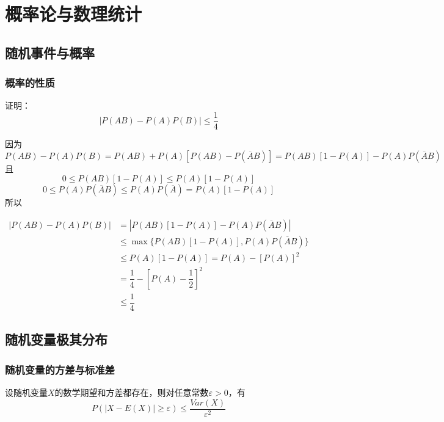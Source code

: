 \chapter{概率论与数理统计}

\section{随机事件与概率}

\subsection{概率的性质}

\begin{proposition}

    证明：
    \[|P(AB) - P(A)P(B)| \leq \dfrac{1}{4}\]

\end{proposition}

\begin{proposition}

    因为
    \[P(AB) - P(A)P(B) = P(AB) + P(A)[P(AB) - P(\overline{A}B)] = P(AB)[1 - P(A)] - P(A)P(\overline{A}B)\]
    且
    \[0 \leq P(AB)[1 - P(A)] \leq P(A)[1 - P(A)]\]
    \[0 \leq P(A)P(\overline{A}B) \leq P(A)P(\overline{A}) = P(A)[1 - P(A)]\]
    所以
    
    \begin{align*}
        |P(AB) - P(A)P(B)| & = |P(AB)[1 - P(A)] - P(A)P(\overline{A}B)| \\
        & \leq \max\{P(AB)[1 - P(A)], P(A)P(\overline{A}B)\} \\
        & \leq P(A)[1 - P(A)] = P(A) - [P(A)]^2 \\
        & = \dfrac{1}{4} - \left[ P(A) - \dfrac{1}{2} \right]^2 \\
        & \leq \dfrac{1}{4}
    \end{align*}

\end{proposition}

\section{随机变量极其分布}

\subsection{随机变量的方差与标准差}

\begin{theorem}[Chebyshev不等式]
    
    设随机变量$X$的数学期望和方差都存在，则对任意常数$\varepsilon > 0$，有
    \[P(|X - E(X)| \geq \varepsilon) \leq \dfrac{Var(X)}{\varepsilon^2}\]

\end{theorem}

